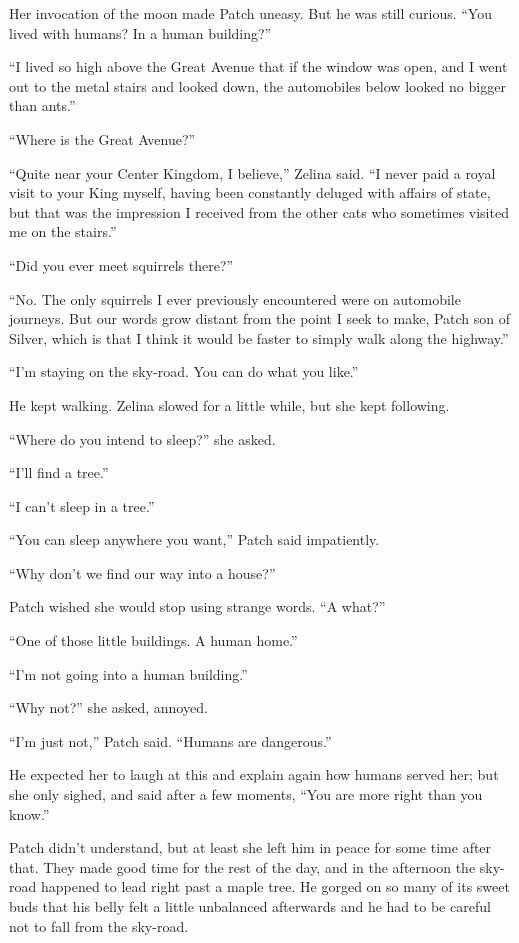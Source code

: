 \documentclass[ebook,oneside,openany,17pt]{memoir}
\newenvironment{tolerant}[1]{%
  \par\tolerance=#1\relax
}{%
  \par
}
\begin{document}
Her invocation of the moon made Patch uneasy. But he was still
curious. “You lived with humans? In a human building?”

“I lived so high above the Great Avenue that if the window was open,
and I went out to the metal stairs and looked down, the automobiles
below look\-ed no bigger than ants.”

“Where is the Great Avenue?”

“Quite near your Center Kingdom, I believe,” Zelina said. “I never
paid a royal visit to your King myself, having been constantly deluged
with affairs of state, but that was the impression I received from the
other cats who sometimes visited me on the stairs.”

“Did you ever meet squirrels there?”

“No. The only squirrels I ever previously encountered were on
automobile journeys. But our words grow distant from the point I seek
to make, Patch son of Silver, which is that I think it would be faster
to simply walk along the highway.”

“I’m staying on the sky-road. You can do what you like.”

He kept walking. Zelina slowed for a little while, but she kept
following.

“Where do you intend to sleep?” she asked.

“I’ll find a tree.”

“I can’t sleep in a tree.”

“You can sleep anywhere you want,” Patch said impatiently.

“Why don’t we find our way into a house?”

Patch wished she would stop using strange words. “A what?”

“One of those little buildings. A human home.”

“I’m not going into a human building.”

“Why not?” she asked, annoyed.

“I’m just not,” Patch said. “Humans are dangerous.”

\begin{tolerant}{1000}
He expected her to laugh at this and explain again how humans served
her; but she only sighed, and said after a few moments, “You are more
right than you know.”
\end{tolerant}

Patch didn’t understand, but at least she left him in peace for some
time after that. They made good time for the rest of the day, and in
the afternoon the sky-road happened to lead right past a maple
tree. He gorged on so many of its sweet buds that his belly felt a
little unbalanced afterwards and he had to be careful not to fall from
the sky-road.
\end{document}
